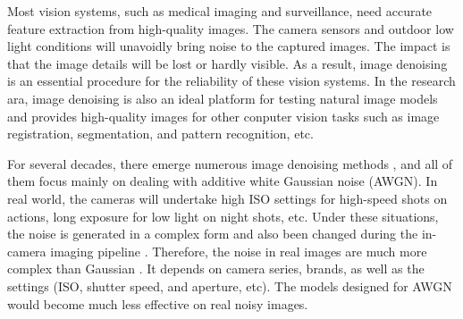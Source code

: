 \documentclass[10pt,twocolumn,letterpaper]{article}
\begin{document}
Most vision systems, such as medical imaging and surveillance, need accurate feature extraction from high-quality images. The camera sensors and outdoor low light conditions will unavoidly bring noise to the captured images. The impact is that the image details will be lost or hardly visible. As a result, image denoising is an essential procedure for the reliability of these vision systems. In the research ara, image denoising is also an ideal platform for testing natural image models and provides high-quality images for other conputer vision tasks such as image registration, segmentation, and pattern recognition, etc. 

For several decades, there emerge numerous image denoising methods \cite{nlm,foe,ksvd,bm3d,cbm3d,lssc,epll,mlp,wnnm,csf,pgpd,chen2015learning}, and all of them focus mainly on dealing with additive white Gaussian noise (AWGN). In real world, the cameras will undertake high ISO settings for high-speed shots on actions, long exposure for low light on night shots, etc. Under these situations, the noise is generated in a complex form and also been changed during the in-camera imaging pipeline \cite{NewInCamera,crosschannel2016}. Therefore, the noise in real images are much more complex than Gaussian \cite{crosschannel2016,healey1994radiometric}. It depends on camera series, brands, as well as the settings (ISO, shutter speed, and aperture, etc). The models designed for AWGN would become much less effective on real noisy images. 
\end{document}
